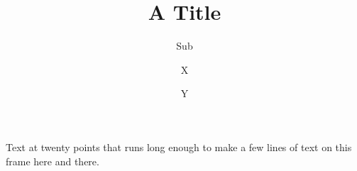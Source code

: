 \documentclass[20pt,c]{beamer}
\title[Short]{A Title}
\subtitle{Sub}
\author{X \and Y}
\begin{document}
\begin{frame}
Text at twenty points that runs long enough to make a few lines of text on this frame here and there.
\end{frame}
\end{document}
